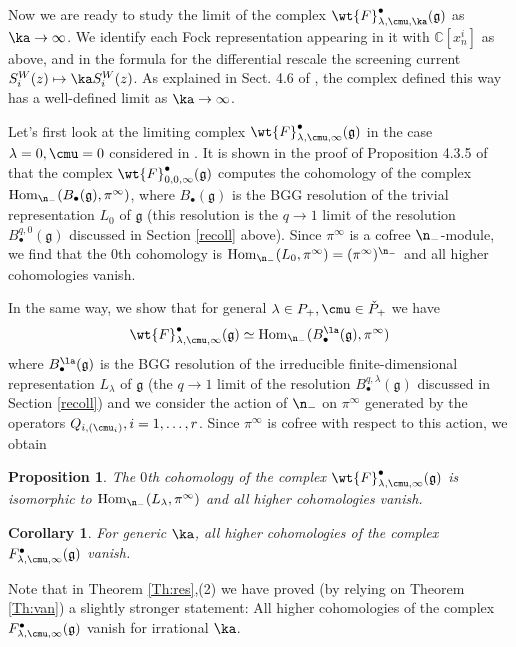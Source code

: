 \documentclass{amsart}
\newcommand{\on}{\operatorname}
\newcommand{\+}{\mathop{\oplus}}
\renewcommand{\*}{{\otimes}}
\newcommand{\mf}{\mathfrak}
\newcommand{\g}{\mf{g}}
\newcommand{\C}{\mathbb{C}}
\newcommand{\lam}{\lambda}
\theoremstyle{theorem}
\newtheorem{Pro}[Th]{Proposition}
\newtheorem{Co}[Th]{Corollary}
\theoremstyle{remark}
\numberwithin{equation}{section}
\begin{document}
Now we are ready to study the limit of the complex
$\wt{F}^\bullet_{\lam,\cmu,\ka}(\g)$ as $\ka \to \infty$. We identify
each Fock representation appearing in it with $\C[x^i_n]$ as above,
and in the formula for the differential rescale the screening
current $S^W_i(z) \mapsto \ka S^W_i(z)$. As explained in Sect. 4.6
of \cite{FF93}, the complex defined this way has a well-defined limit
as $\ka \to \infty$.

Let's first look at the limiting complex
$\wt{F}^\bullet_{\lam,\cmu,\infty}(\g)$ in the case $\lam=0, \cmu=0$
considered in \cite{FF93}. It is shown in the proof of Proposition
4.3.5 of \cite{FF93} that the complex
$\wt{F}^\bullet_{0,0,\infty}(\g)$ computes the cohomology of the
complex $\on{Hom}_{\n_-}(B_\bullet(\g),\pi^\infty)$, where
$B_\bullet(\g)$ is the BGG resolution of the trivial representation
$L_0$ of $\g$ (this resolution is the $q \to 1$ limit of the
resolution $B^{q,0}_\bullet(\g)$ discussed in Section \ref{recoll}
above). Since $\pi^\infty$ is a cofree $\n_-$-module, we find that the
$0$th cohomology is $\on{Hom}_{\n_-}(L_0,\pi^\infty) =
(\pi^\infty)^{\n_-}$ and all higher cohomologies vanish.

In the same way, we show that for general $\lam \in P_+, \cmu \in
\check{P}_+$ we have
$$
\wt{F}^\bullet_{\lam,\cmu,\infty}(\g) \simeq
\on{Hom}_{\n_-}(B^\la_\bullet(\g),\pi^\infty)
$$
where $B^\la_\bullet(\g)$ is the BGG resolution of the irreducible
finite-dimensional representation $L_\lam$ of $\g$ (the $q \to 1$
limit of the resolution $B^{q,\lam}_\bullet(\g)$ discussed in Section
\ref{recoll}) and we consider the action of $\n_-$ on $\pi^\infty$
generated by the operators $Q_{i,(\cmu_i)}, i=1,\dots,r$. Since
$\pi^\infty$ is cofree with respect to this action, we obtain

\begin{Pro}
The $0$th cohomology of the complex
$\wt{F}^\bullet_{\lam,\cmu,\infty}(\g)$ is isomorphic to 
$\on{Hom}_{\n_-}(L_\lam,\pi^\infty)$ and all higher cohomologies vanish.
\end{Pro}

\begin{Co}
For generic $\ka$, all higher cohomologies of the complex
$F^\bullet_{\lam,\cmu,\infty}(\g)$ vanish.
\end{Co}

Note that in Theorem \ref{Th:res},(2) we have proved (by relying on
Theorem \ref{Th:van}) a slightly stronger statement: All higher
cohomologies of the complex $F^\bullet_{\lam,\cmu,\infty}(\g)$ vanish
for irrational $\ka$.
\end{document}
